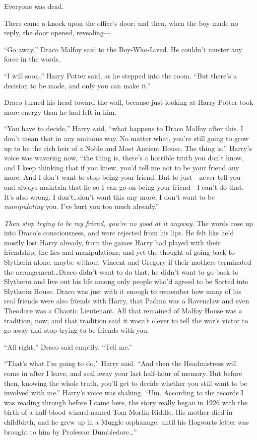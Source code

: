Everyone was dead.

There came a knock upon the office’s door; and then, when the boy made no reply, the door opened, revealing—

“Go away,” Draco Malfoy said to the Boy-Who-Lived. He couldn’t muster any force in the words.

“I will soon,” Harry Potter said, as he stepped into the room. “But there’s a decision to be made, and only you can make it.”

Draco turned his head toward the wall, because just looking at Harry Potter took more energy than he had left in him.

“You have to decide,” Harry said, “what happens to Draco Malfoy after this. I don’t mean that in any ominous way. No matter what, you’re still going to grow up to be the rich heir of a Noble and Most Ancient House. The thing is,” Harry’s voice was wavering now, “the thing is, there’s a horrible truth you don’t know, and I keep thinking that if you knew, you’d tell me not to be your friend any more. And I don’t want to stop being your friend. But to just—never tell you—and always maintain that lie so I can go on being your friend—I can’t do that. It’s also wrong. I don’t…don’t want this any more, I don’t want to be \emph{manipulating} you. I’ve hurt you too much already.”

\emph{Then stop trying to be my friend, you’re no good at it anyway.} The words rose up into Draco’s consciousness, and were rejected from his lips. He felt like he’d mostly lost Harry already, from the games Harry had played with their friendship, the lies and manipulations; and yet the thought of going back to Slytherin alone, maybe without Vincent and Gregory if their mothers terminated the arrangement…Draco didn’t want to do that, he didn’t want to go back to Slytherin and live out his life among only people who’d agreed to be Sorted into Slytherin House. Draco was just with it enough to remember how many of his real friends were also friends with Harry, that Padma was a Ravenclaw and even Theodore was a Chaotic Lieutenant. All that remained of Malfoy House was a tradition, now; and that tradition said it wasn’t clever to tell the war’s victor to go away and stop trying to be friends with you.

“All right,” Draco said emptily. “Tell me.”

“That’s what I’m going to do,” Harry said. “And then the Headmistress will come in after I leave, and seal away your last half-hour of memory. But before then, knowing the whole truth, you’ll get to decide whether you still want to be involved with me.” Harry’s voice was shaking. “Um. According to the records I was reading through before I came here, the story really began in 1926 with the birth of a half-blood wizard named Tom Morfin Riddle. His mother died in childbirth, and he grew up in a Muggle orphanage, until his Hogwarts letter was brought to him by Professor Dumbledore…”

